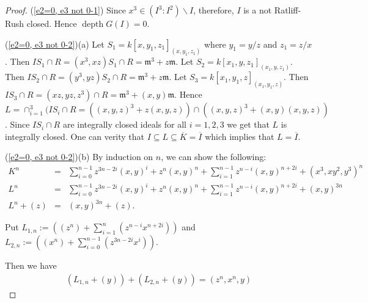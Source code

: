\documentclass[reqno,a4paper,dvipsnames]{amsart}
\newcommand{\m}{\mathfrak{m} }
\newcommand{\depth}{\operatorname{depth}}
\theoremstyle{definition}
\begin{document}
  \begin{proof}
 (\ref{e2=0, e3 not 0-1}) 
 Since $x^3 \in (I^3: I^2)\backslash I$, therefore,  $I$ is a not Ratliff-Rush closed. Hence $\depth G(I)=0$.  
  
 (\ref{e2=0, e3 not 0-2})(a) Let $S_1 = k[x, y_1, z_1]_{(x,y_1, z_1)}$ where $y_1 = y/z$ and $z_1 = z/x$. Then $I S_1  \cap R = (x^3, xz)S_1 \cap R = \m^3 + z \m$. Let  $S_2 = k[x_1, y, z_1]_{(x_1, y, z_1)}$. Then $IS_2 \cap R = (y^3 , yz)S_2 \cap R = \m^3 + z\m$.  Let  $S_3 = k[x_1, y_1, z]_{(x_1, y_1, z)}$. 
 Then $I S_3 \cap R = (xz, yz, z^3) \cap R = \m^3 + (x,y) \m$.  
Hence  $L =  \cap_{i=1}^{3}(IS_i \cap R = ((x,y,z)^3+ z (x,y,z)) \cap ((x,y,z)^3 + (x,y)(x,y,z))$.  Since $IS_i \cap R$ are integrally closed  ideals for all $i=1,2,3$ we get that $L$   is integrally closed. One can verity that $I \subseteq L \subseteq \overline {K} = \overline{I}$ which implies that  $L = \overline{I}$. 


(\ref{e2=0, e3 not 0-2})(b)  By induction on $n$, we can show the following:  
 \begin{eqnarray} 
 \label{powers of K}
     K^n 
  &= &\sum_{i=0}^{n-1} z^{3n-2i} (x,y)^i + z^n    (x,y)^n
     + \sum_{i=1}^{n-1} z^{n-i} (x,y)^{n+2i}
     + (x^3, xy^2, y^3)^n\\ \label{powers of L}
          L^n 
& =&\sum_{i=0}^{n-1} z^{3n-2i} (x,y)^i   + z^n (x,y)^n
     + \sum_{i=1}^{n-1} z^{n-i} (x,y)^{n+2i} + (x,y)^{3n}\\ \label{powers of ln plus z}
     L^n + (z)
&= &(x,y)^{3n} + (z). 
\end{eqnarray}

Put $ L_{1,n} 
:= \left(  (z^n)
     + \displaystyle\sum_{i=1}^{n} (z^{n-i} x^{n+2i}) \right)$ and $ L_{2,n}
:=  \left(  (x^n) + \displaystyle \sum_{i=0}^{n-1} (z^{3n-2i} x^i)
    \right).$

    Then  we have
     \begin{eqnarray*}
 \left(  L_{1,n} + (y) \right) + 
     \left(  L_{2,n}    + (y) \right)
     =(z^n, x^n,y)
   \end{eqnarray*} 
   

\end{proof}
\end{document}
